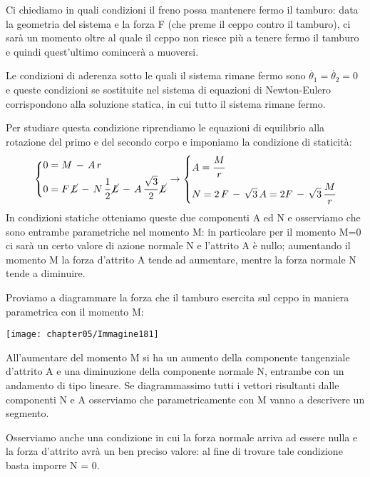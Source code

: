 Ci chiediamo in quali condizioni il freno possa mantenere fermo il tamburo: data la geometria del sistema e la forza F (che preme il ceppo contro il tamburo), ci sarà un momento oltre al quale il ceppo non riesce più a tenere fermo il tamburo e quindi quest'ultimo comincerà a muoversi.

Le condizioni di aderenza sotto le quali il sistema rimane fermo sono $\dot{\theta_1} = \dot{\theta_2} = 0$ e queste condizioni se sostituite nel sistema di equazioni di Newton-Eulero corrispondono alla soluzione statica, in cui tutto il sistema rimane fermo.

Per studiare questa condizione riprendiamo le equazioni di equilibrio alla rotazione del primo e del secondo corpo e imponiamo la condizione di staticità:
\[
\begin{dcases}
0 = M\,-\,A\,r\\
0 = F\,\cancel{L}\,-\,N\,\cfrac{1}{2}\,\cancel{L}\,-\,A\,\cfrac{\sqrt{3}}{2}\,\cancel{L}
\end{dcases}
\rightarrow
\begin{dcases}
A=\cfrac{M}{r}\\
N = 2\,F\,-\,\sqrt{3}\,A = 2F\,-\,\sqrt{3}\,\cfrac{M}{r}
\end{dcases}
\]
In condizioni statiche otteniamo queste due componenti A ed N e osserviamo che sono entrambe parametriche nel momento M: in particolare per il momento M=0 ci sarà un certo valore di azione normale N e l'attrito A è nullo; aumentando il momento M la forza d'attrito A tende ad aumentare, mentre la forza normale N tende a diminuire.

Proviamo a diagrammare la forza che il tamburo esercita sul ceppo in maniera parametrica con il momento M:

\begin{minipage}{.35\textwidth}
\centering
\texttt{[image: chapter05/Immagine181]}
\end{minipage}
\hfill
\begin{minipage}{.65\textwidth}
All'aumentare del momento M si ha un aumento della componente tangenziale d'attrito A e una diminuzione della componente normale N, entrambe con un andamento di tipo lineare. Se diagrammassimo tutti i vettori risultanti dalle componenti N e A osserviamo che parametricamente con M vanno a descrivere un segmento.

Osserviamo anche una condizione in cui la forza normale arriva ad essere nulla e la forza d'attrito avrà un ben preciso valore: al fine di trovare tale condizione basta imporre N = 0.
\end{minipage}

